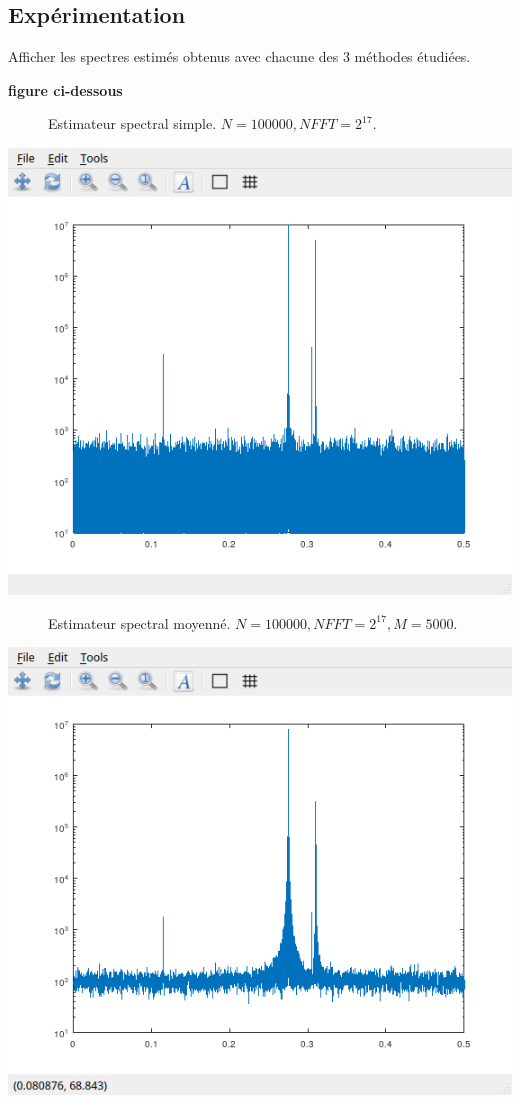 \documentclass{article}
\newcommand{\debutrep}[1]{\color{blue}\begin{center} \hrulefill \textbf{ #1 } \hrulefill \end{center} }
\begin{document}
\subsection{Expérimentation}

Afficher les spectres estimés obtenus avec chacune des 3 méthodes étudiées.

\debutrep{figure ci-dessous}
\begin{figure}[H]

\caption{Estimateur spectral simple. $N=100000, NFFT=2^{17}$.}
\end{figure}
\includegraphics[width=\columnwidth]{Part4simple.png}
\begin{figure}[H]

\caption{Estimateur spectral moyenné. $N=100000, NFFT=2^{17}, M=5000$.}
\end{figure}
\includegraphics[width=\columnwidth]{Part4moy.png}
\end{document}
